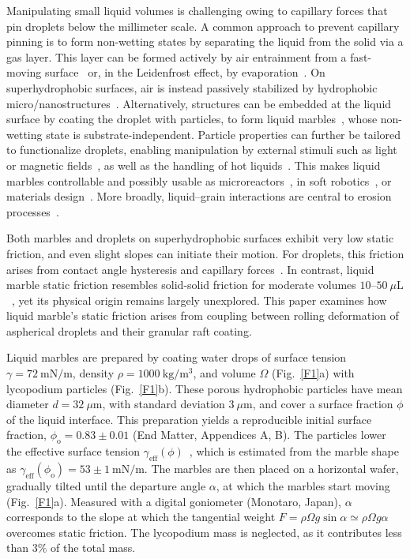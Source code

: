 \documentclass[twocolumn, prl,
 amsmath,amssymb,
 superscriptaddress,aps,
]{revtex4-2}
\begin{document}
Manipulating small liquid volumes is challenging owing to capillary forces that pin droplets below the millimeter scale. A common approach to prevent capillary pinning is to form non-wetting states by separating the liquid from the solid via a gas layer. This layer can be formed actively by air entrainment from a fast-moving surface~\cite{lhuissier2013levitation,gauthier2016aerodynamic} or, in the Leidenfrost effect, by evaporation~\cite{biance2003leidenfrost}. On superhydrophobic surfaces, air is instead passively stabilized by hydrophobic micro/nanostructures~\cite{shibuichi1996super,blossey2003self}. Alternatively, structures can be embedded at the liquid surface by coating the droplet with particles, to form liquid marbles~\cite{aussillous2001liquid}, whose non-wetting state is substrate-independent. Particle properties can further be tailored to functionalize droplets, enabling manipulation by external stimuli such as light~\cite{paven2016light} or magnetic fields~\cite{zhao2010magnetic}, as well as the handling of hot liquids~\cite{roy2025hot}. This makes liquid marbles controllable and possibly usable as microreactors~\cite{sheng2015silica, oliveira2017potential,vadivelu2017liquid, tian2010liquid}, in soft robotics~\cite{jeon2025particle}, or materials design~\cite{rong2019liquid}.
More broadly, liquid--grain interactions are central to erosion processes~\cite{trottet2025sandball}.

Both marbles and droplets on superhydrophobic surfaces exhibit very low static friction, and even slight slopes can initiate their motion. For droplets, this friction arises from contact angle hysteresis and capillary forces~\cite{pockels1914randwinkel,furmidge1962studies}. In contrast, liquid marble static friction resembles solid-solid friction for moderate volumes $10$--$50~\mu\mathrm{L}$~\cite{jin2023marbles}, yet its physical origin remains largely unexplored. This paper examines how liquid marble's static friction arises from coupling between rolling deformation of aspherical droplets and their granular raft coating.

Liquid marbles are prepared by coating water drops of surface tension $\gamma=72~\mathrm{mN/m}$, density $\rho=1000~\mathrm{kg/m^3}$, and volume $\Omega$ (Fig.~\ref{F1}a) with lycopodium particles (Fig.~\ref{F1}b). These porous hydrophobic particles have mean diameter $d=32~\mu$m, with standard deviation $3~\mu$m, and cover a surface fraction $\phi$ of the liquid interface. This preparation yields a reproducible initial surface fraction, $\phi_\mathrm{o}=0.83\pm0.01$ (End Matter, Appendices A, B). The particles lower the effective surface tension $\gamma_\mathrm{eff}(\phi)$~\cite{aussillous2006properties,mchale2011liquid}, which is estimated from the marble shape as $\gamma_\mathrm{eff}(\phi_\mathrm{o})=53\pm1~\mathrm{mN/m}$.
The marbles are then placed on a horizontal wafer, gradually tilted until the departure angle $\alpha$, at which the marbles start moving (Fig.~\ref{F1}a). Measured with a digital goniometer (Monotaro, Japan), $\alpha$ corresponds to the slope at which the tangential weight $F=\rho\Omega g\sin\alpha\simeq\rho\Omega g\alpha$ overcomes static friction. The lycopodium mass is neglected, as it contributes less than $3\%$ of the total mass.
\end{document}
